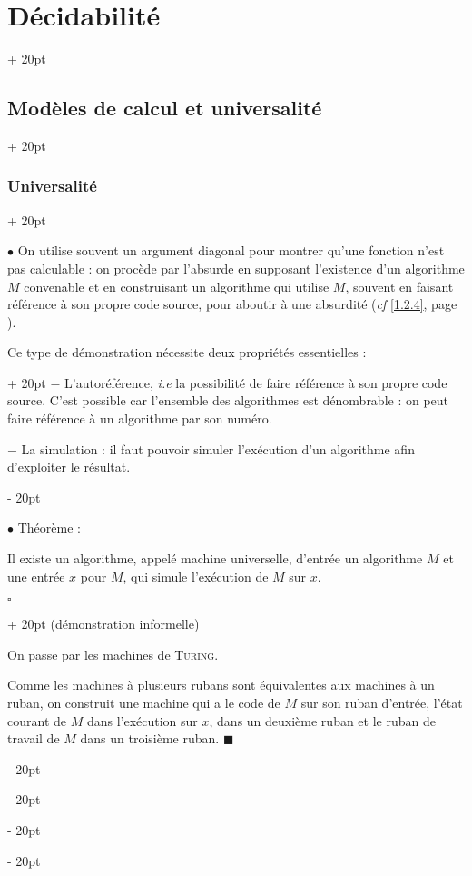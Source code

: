 \documentclass[a4paper, 12pt, twoside]{article}
\newcommand{\ind}[1][20pt]{\advance\leftskip + #1}
\newcommand{\deind}[1][20pt]{\advance\leftskip - #1}
\newenvironment{indt}[2][20pt]{#2 \par \ind[#1]}{\par \deind} %
\newenvironment{proof}[1][{}]{\begin{indt}{$\square$ #1}}{$\blacksquare$ \end{indt}}
\begin{document}
\begin{indt}{\section{Décidabilité}}
\begin{indt}{\subsection{Modèles de calcul et universalité}}
            \vspace{12pt}
            
            \begin{indt}{\subsubsection{Universalité}}
                \label{1.1.5}

                $\bullet$ On utilise souvent un argument diagonal pour montrer qu'une fonction n'est pas calculable : on procède par l'absurde en supposant l'existence d'un algorithme $M$ convenable et en construisant un algorithme qui utilise $M$, souvent en faisant référence à son propre code source, pour aboutir à une absurdité (\textit{cf} \ref{1.2.4}, page \pageref{1.2.4}).

                \begin{indt}{Ce type de démonstration nécessite deux propriétés essentielles :}
                    $-$ L'autoréférence, \textit{i.e} la possibilité de faire référence à son propre code source. C'est possible car l'ensemble des algorithmes est dénombrable : on peut faire référence à un algorithme par son numéro.

                    $-$ La simulation : il faut pouvoir simuler l'exécution d'un algorithme afin d'exploiter le résultat.
                \end{indt}

                \vspace{12pt}
                
                $\bullet$ Théorème :
                \begin{emphBox}
                    Il existe un algorithme, appelé machine universelle, d'entrée un algorithme $M$ et une entrée $x$ pour $M$, qui simule l'exécution de $M$ sur $x$.
                \end{emphBox}

                \begin{proof}
                    (démonstration informelle)

                    On passe par les machines de \textsc{Turing}.

                    Comme les machines à plusieurs rubans sont équivalentes aux machines à un ruban, on construit une machine qui a le code de $M$ sur son ruban d'entrée, l'état courant de $M$ dans l'exécution sur $x$, dans un deuxième ruban et le ruban de travail de $M$ dans un troisième ruban.
                \end{proof}
            \end{indt}
        \end{indt}


\end{indt}
\end{document}
